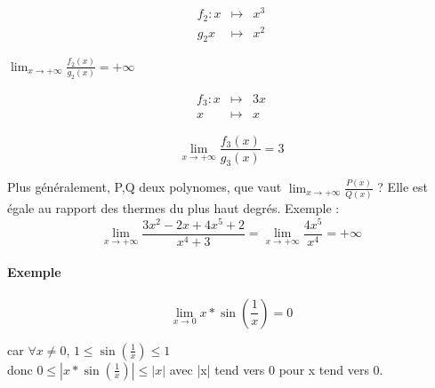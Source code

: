 \begin{align*}
	f_2:x &\mapsto & x^3 \\
	g_2x&\mapsto& x^2
\end{align*}

$\lim_{x \to +\infty} \frac{f_2(x)}{g_2(x)} = +\infty$

\begin{align*}
	f_3:x &\mapsto & 3x \\
	x&\mapsto& x
\end{align*}

\[\lim_{x \to +\infty} \frac{f_3(x)}{g_3(x)} = 3\]

Plus généralement, P,Q deux polynomes, que vaut $\lim_{x\to +\infty} \frac{P(x)}{Q(x)}$ ? Elle est égale au rapport des thermes du plus haut degrés.
Exemple : \[\lim_{x \to +\infty} \frac{3x^2 -2x + 4x^5 +2}{x^4+3} = \lim_{x \to +\infty} \frac{4x^5}{x^4} = +\infty\]

\paragraph{Exemple}
\[\lim_{x \to 0} x*\sin(\frac{1}{x}) = 0\]

car $\forall x \neq 0$, $1 \leq \sin(\frac{1}{x}) \leq 1$
~\\
donc $ 0 \leq |x*\sin(\frac{1}{x})| \leq |x|$ avec |x| tend vers 0 pour x tend vers 0.
